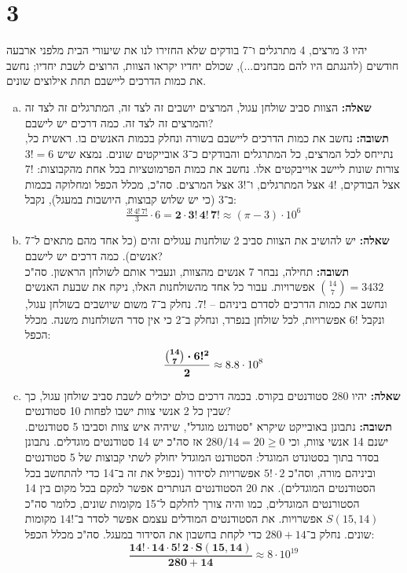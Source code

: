 \documentclass[]{article}
\begin{document}
	\section*{3} %
	יהיו 3 מרצים, 4 מתרגלים ו־7 בודקים שלא החזירו לנו את שיעורי הבית מלפני ארבעה חודשים (להנגתם היו להם מבחנים...), שכולם יחדיו יקראו הצוות, הרוצים לשבת יחדיו; נחשב את כמות הדרכים ליישבם תחת אילוצים שונים. 
	\begin{enumerate}[(a)]
		\item \textbf{שאלה: }הצוות סביב שולחן עגול, המרצים יושבים זה לצד זה, המתרגלים זה לצד זה והמרצים זה לצד זה. כמה דרכים יש לישבם?\\
		\textbf{תשובה: }נחשב את כמות הדרכים ליישבם בשורה ונחלק בכמות האנשים בו. ראשית כל, נתייחס לכל המרצים, כל המתרגלים והבודקים כ־3 אובייקטים שונים. נמצא שיש $3! = 6 $ צורות שונות ליישב אוייבקטים אלו. נחשב את כמות הפרמוטציות בכל אחת מהקבוצות: $ 7! $ אצל הבודקים, $ 4! $ אצל המתרגלים, ו־$ 3! $ אצל המרצים. סה"כ, מכלל הכפל ומחלוקה בכמות ב־3 (כי יש שלוש קבוצות, היושבות במעגל), נקבל:
		\[ \tfrac{3! \, 4! \, 7!}{3} \cdot 6 = \bm{2 \cdot 3! \, 4! \, 7!} \approx (\pi - 3) \cdot 10^6 \]
		\item \textbf{שאלה: }יש להושיב את הצוות סביב 2 שולחנות עגולים זהים (כל אחד מהם מתאים ל־7 אנשים). כמה דרכים יש לישבם?\\
		\textbf{תשובה: }תחילה, נבחר 7 אנשים מהצוות, ונעביר אותם לשולחן הראשון. סה"כ $\binom{14}{7} = 3432$ אפשרויות. עבור כל אחד מהשולחנות האלו, ניקח את שבעת האנשים ונחשב את כמות הדרכים לסדרם ביניהם – $ 7! $. נחלק ב‏־$7$ משום שיושבים בשולחן עגול, ונקבל $ 6! $ אפשרויות, לכל שולחן בנפרד, ונחלק ב־2 כי אין סדר השולחנות משנה. מכלל הכפל: 
		\[ \bm{\frac{\tbinom{14}{7} \cdot 6!^2}{2}} \approx 8.8 \cdot 10^{8} \]
		\item \textbf{שאלה: }יהיו 280 סטודנטים בקורס. בכמה דרכים כולם יכולים לשבת סביב שולחן עגול, כך שבין כל 2 אנשי צוות ישבו לפחות 10 סטודנטים? \\
		\textbf{תשובה: }נתבונן באובייקט שיקרא "סטודנט מוגדל", שיהיה איש צוות וסביבו 5 סטודנטים. ישנם 14 אנשי צוות, וכי $ 280/14 = 20 \ge 0 $ אז סה"כ יש 14 סטודנטים מוגדלים. נתבונן בסדר בתוך בסטונדט המוגדל: הסטודנט המוגדל יחולק לשתי קבוצות של 5 סטודנטים וביניהם מורה, וסה"כ $ 5! \cdot 2 $ אפשרויות לסידור (נכפיל את זה ב־14 כדי להתחשב בכל הסטודנטים המוגדלים). את 20 הסטודנטים הנותרים אפשר למקם בכל מקום בין 14 הסטורנטים המוגדלים, כמו והיה צורך לחלקם ל־15 מקומות שונים, כלומר סה"כ $S(15, 14)$ אפשרויות. את הסטודנטים המודלים עצמם אפשר לסדר ב־$ 14! $ מקומות שונים. נחלק ב־$ 280 + 14 $ כדי לקחת בחשבון את הסידור במעגל. סה"כ מכלל הכפל: 
		\[ \bm{\frac{14! \cdot 14 \cdot 5!\, 2 \cdot S(15, 14)}{280 + 14}} \approx 8 \cdot 10^{19} \]
	\end{enumerate}
	
\end{document}
